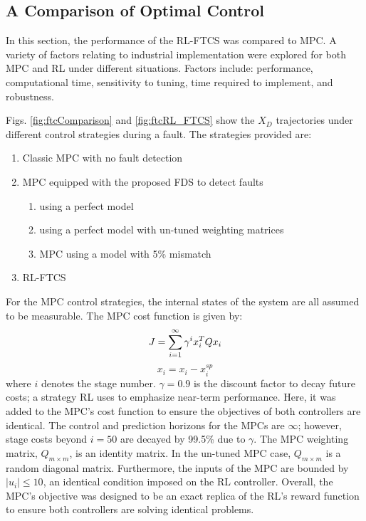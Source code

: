 \subsection{A Comparison of Optimal Control}

In this section, the performance of the RL-FTCS was compared to MPC. A variety of factors relating to industrial implementation were explored for both MPC and RL under different situations. Factors include: performance, computational time, sensitivity to tuning, time required to implement, and robustness.

Figs. \ref{fig:ftcComparison} and \ref{fig:ftcRL_FTCS} show the $X_D$ trajectories under different control strategies during a fault. The strategies provided are:
\begin{enumerate}
    \item Classic MPC with no fault detection
    \item MPC equipped with the proposed FDS to detect faults
    \begin{enumerate}
        \item using a perfect model
        \item using a perfect model with un-tuned weighting matrices
        \item MPC using a model with 5\% mismatch 
    \end{enumerate}
    \item RL-FTCS
\end{enumerate}
For the MPC control strategies, the internal states of the system are all assumed to be measurable. The MPC cost function is given by:
\begin{equation}
        J = \sum\limits^{\infty}_{i=1} \gamma^i x_{i}^T Q x_{i} \\
\end{equation}
$$   x_{i} = x_i - x_i^{sp}$$
where $i$ denotes the stage number.  $\gamma = 0.9$ is the discount factor to decay future costs; a strategy RL uses to emphasize near-term performance. Here, it was added to the MPC's cost function to ensure the objectives of both controllers are identical.  The control and prediction horizons for the MPCs are $\infty$; however, stage costs beyond $i = 50$ are decayed by 99.5\% due to $\gamma$. The MPC weighting matrix, $Q_{m \times m}$, is an identity matrix.  In the un-tuned MPC case, $Q_{m \times m}$ is a random diagonal matrix. Furthermore, the inputs of the MPC are bounded by $|u_i| \leq 10$, an identical condition imposed on the RL controller. Overall, the MPC's objective was designed to be an exact replica of the RL's reward function to ensure both controllers are solving identical problems.

